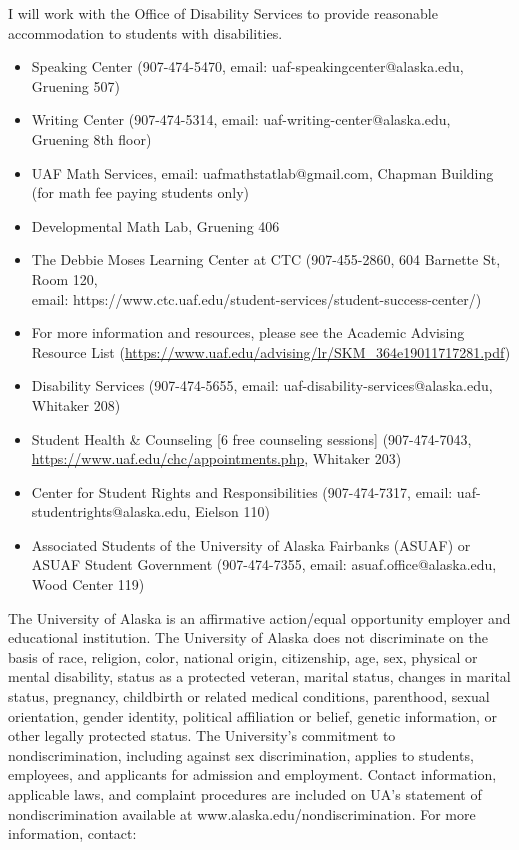\documentclass[12pt]{article}
\begin{document}
 I will work with the Office of Disability Services to provide reasonable accommodation to students with disabilities.

\begin{itemize}
\setlength\itemsep{0em}
        \item Speaking Center (907-474-5470,
        email: {uaf-speakingcenter@alaska.edu}, Gruening 507)
\item Writing Center (907-474-5314, email: {uaf-writing-center@alaska.edu}, Gruening 8th floor)
\item UAF Math Services, email: {uafmathstatlab@gmail.com}, Chapman Building (for math fee paying students only)
\item Developmental Math Lab, Gruening 406
\item The Debbie Moses Learning Center at CTC (907-455-2860, 604 Barnette St, Room 120,\\ email: {https://www.ctc.uaf.edu/student-services/student-success-center/})
\item For more information and resources, please see the Academic Advising Resource List (\url{https://www.uaf.edu/advising/lr/SKM_364e19011717281.pdf})
\end{itemize}

\begin{itemize}
\setlength\itemsep{0em}
\item Disability Services (907-474-5655, email: {uaf-disability-services@alaska.edu}, Whitaker 208)
\item Student Health \& Counseling [6 free counseling sessions] (907-474-7043, \url{https://www.uaf.edu/chc/appointments.php}, Whitaker 203)
\item Center for Student Rights and Responsibilities (907-474-7317, email: {uaf-studentrights@alaska.edu}, Eielson 110)
\item Associated Students of the University of Alaska Fairbanks (ASUAF) or ASUAF Student Government (907-474-7355, email: {asuaf.office@alaska.edu}, Wood Center 119)
\end{itemize}

The University of Alaska is an affirmative action/equal opportunity employer and educational institution. The University of Alaska does not discriminate on the basis of race, religion, color, national origin, citizenship, age, sex, physical or mental disability, status as a protected veteran, marital status, changes in marital status, pregnancy, childbirth or related medical conditions, parenthood, sexual orientation, gender identity, political affiliation or belief, genetic information, or other legally protected status. The University's commitment to nondiscrimination, including against sex discrimination, applies to students, employees, and applicants for admission and employment. Contact information, applicable laws, and complaint procedures are included on UA's statement of nondiscrimination available at www.alaska.edu/nondiscrimination. For more information, contact:
\end{document}
